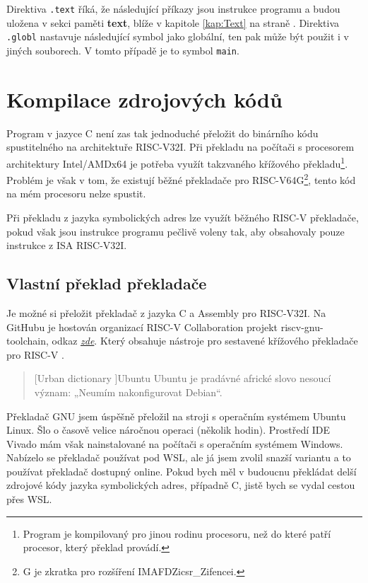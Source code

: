 \documentclass[FM,BP]{tulthesis}
\begin{document}
Direktiva \verb|.text| říká, že následující příkazy jsou instrukce programu a budou uložena v sekci paměti \textbf{text}, blíže v kapitole \ref{kap:Text} na straně \pageref{kap:Text}. Direktiva \verb|.globl| nastavuje následující symbol jako globální, ten pak může být použit i v jiných souborech. V tomto případě je to symbol \verb|main|.

\section{Kompilace zdrojových kódů}
Program v jazyce C není zas tak jednoduché přeložit do binárního kódu spustitelného na architektuře RISC-V32I. Při překladu na počítači s procesorem architektury Intel/AMDx64 je potřeba využít takzvaného křížového překladu\footnote{Program je kompilovaný pro jinou rodinu procesoru, než do které patří procesor, který překlad provádí.}. Problém je však v tom, že existují běžné překladače pro RISC-V64G\footnote{G je zkratka pro rozšíření IMAFDZicsr\_Zifencei.}, tento kód na mém procesoru nelze spustit. 

Při překladu z jazyka symbolických adres lze využít běžného RISC-V překladače, pokud však jsou instrukce programu pečlivě voleny tak, aby obsahovaly pouze instrukce z ISA RISC-V32I.

\subsection{Vlastní překlad překladače}
Je možné si přeložit překladač z jazyka C a Assembly pro RISC-V32I. Na GitHubu je hostován organizací RISC-V Collaboration projekt riscv-gnu-toolchain, odkaz \href{https://github.com/riscv-collab/riscv-gnu-toolchain}{\emph{zde}}. Který obsahuje nástroje pro sestavené křížového překladače pro RISC-V \cite{github_GNU_compiler}.

\begin{quote}[Urban dictionary \cite{urbandictionary_Ubuntu}]{Ubuntu}
Ubuntu je pradávné africké slovo nesoucí význam: „Neumím nakonfigurovat Debian“.
\end{quote}

Překladač GNU jsem úspěšně přeložil na stroji s operačním systémem Ubuntu Linux. Šlo o časově velice náročnou operaci (několik hodin). Prostředí IDE Vivado mám však nainstalované na počítači s operačním systémem Windows. Nabízelo se překladač používat pod WSL, ale já jsem zvolil snazší variantu a to používat překladač dostupný online. Pokud bych měl v budoucnu překládat delší zdrojové kódy jazyka symbolických adres, případně C, jistě bych se vydal cestou přes WSL. 
\end{document}
